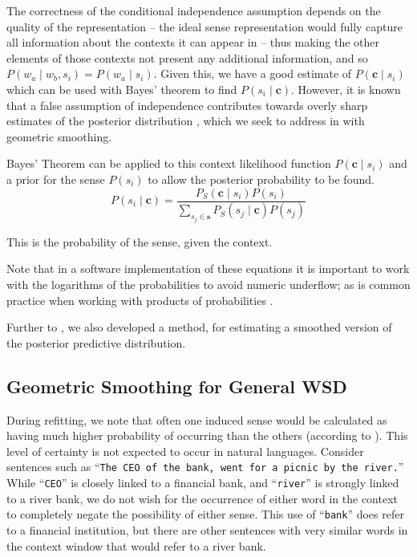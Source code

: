 \documentclass{sig-alternate}
\renewcommand{\c}{\mathbf{c}}
\newcommand{\s}{\mathbf{s}}
\newcommand{\wordquote}[1]{\enquote{\texttt{#1}}}
\begin{document}
The correctness of the conditional independence assumption depends on the quality of the representation -- the ideal sense representation would fully capture all information about the contexts it can appear in -- thus making the other elements of those contexts not present any additional information, and so  $P(w_a \mid w_b,s_i)=P(w_a \mid s_i)$. Given this, we have a good estimate of $P(\c \mid s_{i})$ which can be used with Bayes' theorem to find $P( s_i \mid \c)$. However, it is known that a false assumption of independence contributes towards overly sharp estimates of the posterior distribution \cite{rosenfeld2000two}, which we seek to address in  with geometric smoothing.


Bayes' Theorem can be applied to this context likelihood function  $P(\c \mid s_{i})$ and a prior for the sense $P(s_i)$ to allow the posterior probability to be found.
\begin{equation} \label{eq:generalwsd}
P(s_{i} \mid \c) =
\dfrac{P_S(\c \mid s_{i})P(s_{i})}
{\sum_{s_{j}\in\s} P_S(s_{j} \mid \c)P(s_{j})}
\end{equation}

This is the probability of the sense, given the context.

Note that in a software implementation of these equations it is important to work with the logarithms of the probabilities to avoid numeric underflow; as is common practice when working with products of probabilities \parencite{press2007numerical}.

Further to , we also developed a method, for estimating a smoothed version of the posterior predictive distribution.


\subsection{Geometric Smoothing for General WSD} \label{smoothing}


During refitting, we note that often one induced sense would be calculated as having much higher probability of occurring than the others (according to ).
This level of certainty is not expected to occur in natural languages. 
Consider sentences such as \wordquote{The CEO of the bank, went for a picnic by the river.} 
While \wordquote{CEO} is closely linked to a financial bank, and \wordquote{river} is strongly linked to a river bank, we do not wish for the occurrence of either word in the context to completely negate the possibility of either sense.
This use of \wordquote{bank} does refer to a financial institution, but there are other sentences with very similar words in the context window that would refer to a river bank.
\end{document}
